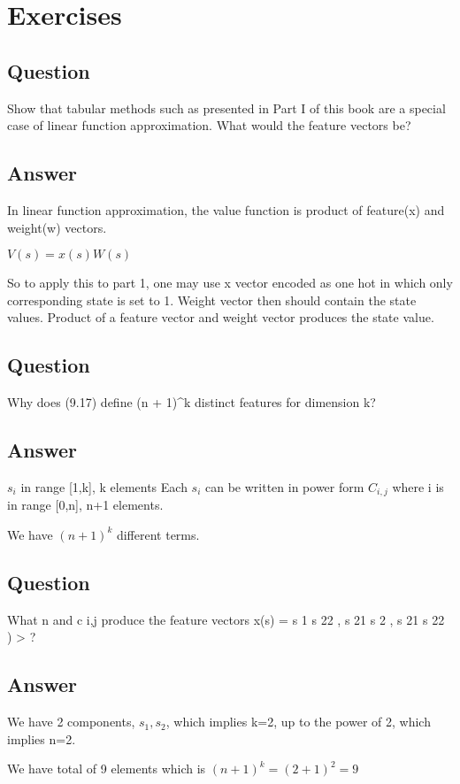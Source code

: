 \documentclass[11pt]{article}
\begin{document}
    \maketitle
    \setcounter{section}{8}


    \section{Exercises}

    \subsection{Question}

    Show that tabular methods such as presented in Part I of this book are a special case of linear function approximation.
    What would the feature vectors be?

    \subsection*{Answer}

    In linear function approximation, the value function is product of feature(x) and weight(w) vectors.

    \noindention $ V(s) = x(s) W(s)$

    So to apply this to part 1, one may use x vector encoded as one hot in which only corresponding state is set to 1.
    Weight vector then should contain the state values.
    Product of a feature vector and weight vector produces the state value.

    \subsection{Question}

    Why does (9.17) define (n + 1)^k distinct features for dimension k?

    \subsection*{Answer}

    $s_i$ in range [1,k], k elements
    Each $s_i$ can be written in power form $C_{i,j}$ where i is in range [0,n], n+1 elements.

    We have $ (n+1)^k $ different terms.

    \subsection{Question}

    What n and c i,j produce the feature vectors x(s) = s 1 s 22 , s 21 s 2 , s 21 s 22 ) > ?

    \subsection*{Answer}

    We have 2 components, $s_1, s_2$, which implies k=2, up to the power of 2, which implies n=2.

    We have total of 9 elements which is $ (n+1)^k = (2+1)^2 = 9 $
\end{document}
